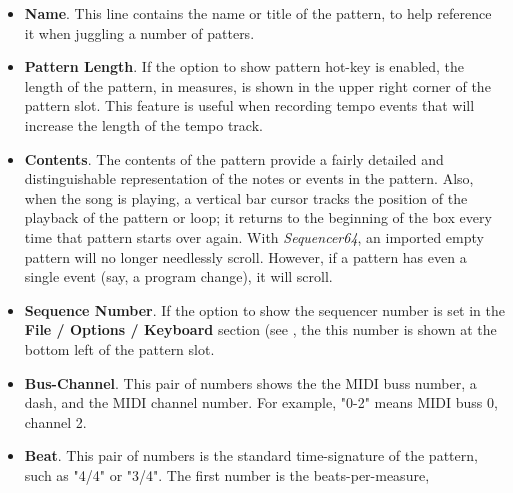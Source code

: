    \begin{itemize}
      \item \textbf{Name}.
         This line contains the name or title of the pattern, to help
         reference it when juggling a number of patters.
      \item \textbf{Pattern Length}.
         If the option to show pattern hot-key is enabled, the length of the
         pattern, in measures, is shown in the upper right corner of the
         pattern slot.  This feature is useful when recording tempo events that
         will increase the length of the tempo track.
      \item \textbf{Contents}.
         The contents of the pattern provide a fairly detailed and
         distinguishable representation of the notes or events in the
         pattern.  Also, when the song is playing, a vertical bar cursor
         tracks the position of the playback of the pattern or loop; it
         returns to the beginning of the box every time that pattern starts
         over again.
         With \textsl{Sequencer64}, an imported empty pattern will no longer
         needlessly scroll.
         However, if a pattern has even a single event (say, a program change),
         it will scroll.
      \item \textbf{Sequence Number}.
         If the option to show the sequencer number is set
         in the \textbf{File / Options / Keyboard} section
         (see ,
         the this number is shown at the bottom left of the pattern slot.
      \item \textbf{Bus-Channel}.
         This pair of numbers shows the the MIDI buss number, a dash, and
         the MIDI channel number.
         For example, "0-2" means MIDI buss 0, channel 2.
      \item \textbf{Beat}.
         This pair of numbers is the standard time-signature of the pattern,
         such as "4/4" or "3/4".  The first number is the beats-per-measure,

\end{itemize}
